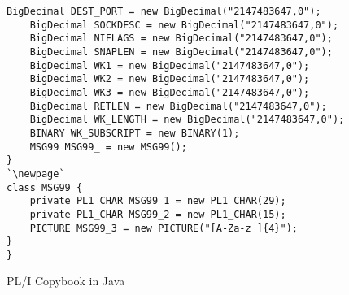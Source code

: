 \begin{figure}[H]
\begin{lstlisting}[language=PL/I, escapeinside=``, firstnumber=32]
	BigDecimal DEST_PORT = new BigDecimal("2147483647,0");
	BigDecimal SOCKDESC = new BigDecimal("2147483647,0");
	BigDecimal NIFLAGS = new BigDecimal("2147483647,0");
	BigDecimal SNAPLEN = new BigDecimal("2147483647,0");
	BigDecimal WK1 = new BigDecimal("2147483647,0");
	BigDecimal WK2 = new BigDecimal("2147483647,0");
	BigDecimal WK3 = new BigDecimal("2147483647,0");
	BigDecimal RETLEN = new BigDecimal("2147483647,0");
	BigDecimal WK_LENGTH = new BigDecimal("2147483647,0");
	BINARY WK_SUBSCRIPT = new BINARY(1);
	MSG99 MSG99_ = new MSG99();
}
`\newpage` 
class MSG99 {
	private PL1_CHAR MSG99_1 = new PL1_CHAR(29);
	private PL1_CHAR MSG99_2 = new PL1_CHAR(15);
	PICTURE MSG99_3 = new PICTURE("[A-Za-z ]{4}");
}
}
\end{lstlisting}
\caption{PL/I Copybook in Java}
\end{figure}

